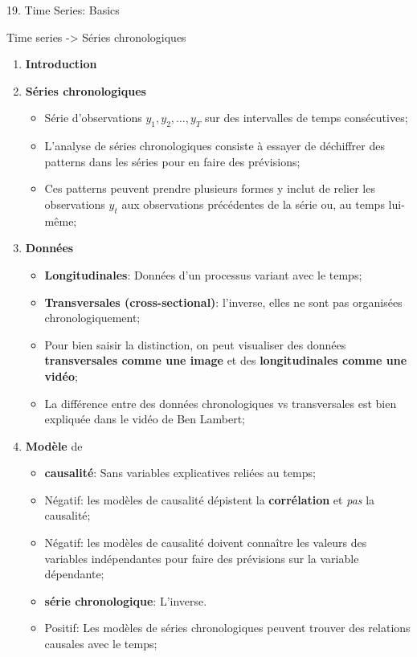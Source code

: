 \documentclass[12pt, titlepage, french]{report}
\begin{document}
\begin{CHPT_SUMM}[label = {timeseries19}]{19. Time Series: Basics}
Time series -> Séries chronologiques
\begin{enumerate}
	\item	\textbf{Introduction}
	\item[]	\textbf{Séries chronologiques}
		\begin{itemize}
		\item	Série d'observations $y_{1}, y_{2}, \dots, y_{T}$ sur des intervalles de temps consécutives;
		\item	L'analyse de séries chronologiques consiste à essayer de déchiffrer des patterns dans les séries pour en faire des prévisions;
		\item[]	Ces patterns peuvent prendre plusieurs formes y inclut de relier les observations $y_{t}$ aux observations précédentes de la série ou, au temps lui-même;
		\end{itemize}
	\item[]	\textbf{Données}
		\begin{itemize}
		\item	\textbf{Longitudinales}: Données d'un processus variant avec le temps;
		\item	\textbf{Transversales (cross-sectional)}: l'inverse, elles ne sont pas organisées chronologiquement;
		\item	Pour bien saisir la distinction, on peut visualiser des données \textbf{transversales comme une image} et des \textbf{longitudinales comme une vidéo};
		\item	La différence entre des données chronologiques vs transversales est bien expliquée dans le vidéo de Ben Lambert;
		\end{itemize}
	\item[]	\textbf{Modèle} de 
		\begin{itemize}
		\item	\textbf{causalité}: Sans variables explicatives reliées au temps;
		\item[]	\textcolor{darkterracotta}{Négatif}: les modèles de causalité dépistent la \textbf{corrélation} et \emph{pas} la causalité;
		\item[]	\textcolor{darkterracotta}{Négatif}: les modèles de causalité doivent connaître les valeurs des variables indépendantes pour faire des prévisions sur la variable dépendante;
		\item	\textbf{série chronologique}: L'inverse.
		\item[]	\textcolor{ao(english)}{Positif}: Les modèles de séries chronologiques peuvent trouver des relations causales avec le temps;

\end{itemize}
\end{enumerate}
\end{CHPT_SUMM}
\end{document}
